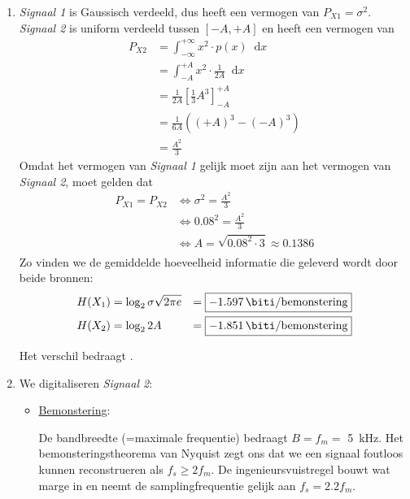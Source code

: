 \documentclass[kulak]{kulakarticle}
\newcommand*\diff{\mathop{}\!\mathrm{d}}
\begin{document}
	\begin{enumerate}
		\item \textit{Signaal 1} is Gaussisch verdeeld, dus heeft een vermogen van \( P_{X1} = \sigma^2 \).
		\textit{Signaal 2} is uniform verdeeld tussen \( [-A,+A] \) en heeft een vermogen van
		\begin{equation*}
			\begin{split}
				P_{X2} & = \int_{-\infty}^{+\infty}x^2\cdot p(x) \diff{x} \\
				       & = \int_{-A}^{+A}x^2\cdot \frac{1}{2A} \diff{x} \\
				       & = \frac{1}{2A} \left[\frac{1}{3}A^3\right]^{+A}_{-A} \\
				       & = \frac{1}{6A} \left((+A)^3-(-A)^3\right) \\
				       & = \frac{A^2}{3}
			\end{split}
		\end{equation*}
		Omdat het vermogen van \textit{Signaal 1} gelijk moet zijn aan het vermogen van \textit{Signaal 2}, moet gelden dat
		\begin{equation*}
			\begin{split}
				P_{X1} = P_{X2} & \Leftrightarrow \sigma^2 = \frac{A^2}{3} \\
				& \Leftrightarrow 0.08^2 = \frac{A^2}{3} \\
				& \Leftrightarrow A = \sqrt{0.08^2\cdot 3} \approx 0.1386 \\
			\end{split}
		\end{equation*}
		Zo vinden we de gemiddelde hoeveelheid informatie die geleverd wordt door beide bronnen:
		\begin{align*}
			&H(X_1) = \log_2{\sigma\sqrt{2\pi e}} &= \boxed{\SI{-1.597}{\biti \per bemonstering}} \\
			&H(X_2) = \log_2{2A} &= \boxed{\SI{-1.851}{\biti \per bemonstering}}
		\end{align*}

		Het verschil bedraagt .

		\newpage

		\item We digitaliseren \textit{Signaal 2}:
		\begin{itemize}
			\item \underline{Bemonstering}:

			De bandbreedte (=maximale frequentie) bedraagt \( B =f_m= \) \SI{5}{\kilo\hertz}. Het bemonsteringstheorema van Nyquist zegt ons dat we een signaal foutloos kunnen reconstrueren als \( f_s \geq 2f_m \). De ingenieursvuistregel bouwt wat marge in en neemt de samplingfrequentie gelijk aan \( f_s=2.2f_m \).


\end{itemize}
\end{enumerate}
\end{document}
